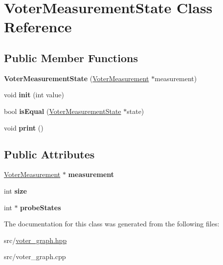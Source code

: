 \hypertarget{classVoterMeasurementState}{\section{Voter\-Measurement\-State Class Reference}
\label{classVoterMeasurementState}
}
\subsection*{Public Member Functions}
\begin{DoxyCompactItemize}
\item 
\hypertarget{classVoterMeasurementState_a35147598e984c9f124284ce82ef1c63a}{{\bfseries Voter\-Measurement\-State} (\hyperlink{classVoterMeasurement}{Voter\-Measurement} $\ast$measurement)}\label{classVoterMeasurementState_a35147598e984c9f124284ce82ef1c63a}

\item 
\hypertarget{classVoterMeasurementState_a0e42569bb960b755395b5eec5b928014}{void {\bfseries init} (int value)}\label{classVoterMeasurementState_a0e42569bb960b755395b5eec5b928014}

\item 
\hypertarget{classVoterMeasurementState_ace14af99c55124ee7a4199c1f2d44b9c}{bool {\bfseries is\-Equal} (\hyperlink{classVoterMeasurementState}{Voter\-Measurement\-State} $\ast$state)}\label{classVoterMeasurementState_ace14af99c55124ee7a4199c1f2d44b9c}

\item 
\hypertarget{classVoterMeasurementState_aa40e89eeb334efa48cba9afaf8aec269}{void {\bfseries print} ()}\label{classVoterMeasurementState_aa40e89eeb334efa48cba9afaf8aec269}

\end{DoxyCompactItemize}
\subsection*{Public Attributes}
\begin{DoxyCompactItemize}
\item 
\hypertarget{classVoterMeasurementState_a7ed3e797dbf98eea1085610aa9b3b2f6}{\hyperlink{classVoterMeasurement}{Voter\-Measurement} $\ast$ {\bfseries measurement}}\label{classVoterMeasurementState_a7ed3e797dbf98eea1085610aa9b3b2f6}

\item 
\hypertarget{classVoterMeasurementState_ae5df2d14e79f6bd4ebb4aafe158c86d3}{int {\bfseries size}}\label{classVoterMeasurementState_ae5df2d14e79f6bd4ebb4aafe158c86d3}

\item 
\hypertarget{classVoterMeasurementState_a89c38e09379dc56c7c9d16542f24a84f}{int $\ast$ {\bfseries probe\-States}}\label{classVoterMeasurementState_a89c38e09379dc56c7c9d16542f24a84f}

\end{DoxyCompactItemize}


The documentation for this class was generated from the following files\-:\begin{DoxyCompactItemize}
\item 
src/\hyperlink{voter__graph_8hpp}{voter\-\_\-graph.\-hpp}\item 
src/voter\-\_\-graph.\-cpp\end{DoxyCompactItemize}
